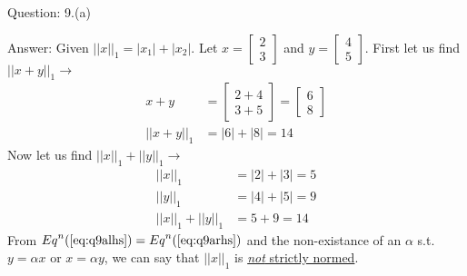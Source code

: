 \documentclass[a4paper]{article}
\begin{document}
\begin{qalist}
		\item[Question: 9.(a)] \setcounter{equation}{0}
		\item[Answer:] 	Given ${||x||}_{1} = |{x}_{1}| +|{x}_{2}|$. Let $x = \begin{bmatrix}2 \\ 3\end{bmatrix}$ and $y=\begin{bmatrix}4 \\ 5\end{bmatrix}$.
			First let us find ${||x+y||}_{1} \rightarrow$
			\begin{align}
				x+y &= \begin{bmatrix}2+4 \\ 3+5\end{bmatrix} = \begin{bmatrix}6 \\ 8\end{bmatrix} \\
				{||x+y||}_{1} &= |6| + |8| = 14 \label{eq:q9alhs}
			\end{align}
			Now let us find ${||x||}_{1} + {||y||}_{1} \rightarrow$
			\begin{align}
				{||x||}_{1} &= |2| + |3| = 5 \\
				{||y||}_{1} &= |4| + |5| = 9\\
				{||x||}_{1} + {||y||}_{1} &= 5 + 9 = 14 \label{eq:q9arhs}
			\end{align}
			From ${Eq}^{n}(\ref{eq:q9alhs}) = {Eq}^{n}(\ref{eq:q9arhs})$ and the non-existance of an $\alpha$ s.t. $y=\alpha x$ or $x = \alpha y $, we can say that ${||x||}_{1}$ is \underline{\emph{not} strictly normed}.
			

\end{qalist}
\end{document}
